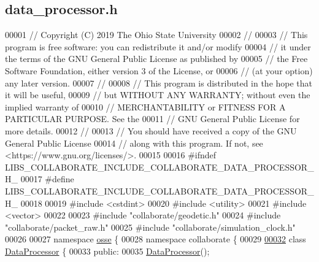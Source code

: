 \hypertarget{data__processor_8h_source}{}\subsection{data\+\_\+processor.\+h}
\label{data__processor_8h_source}

\begin{DoxyCode}
00001 \textcolor{comment}{// Copyright (C) 2019 The Ohio State University}
00002 \textcolor{comment}{//}
00003 \textcolor{comment}{// This program is free software: you can redistribute it and/or modify}
00004 \textcolor{comment}{// it under the terms of the GNU General Public License as published by}
00005 \textcolor{comment}{// the Free Software Foundation, either version 3 of the License, or}
00006 \textcolor{comment}{// (at your option) any later version.}
00007 \textcolor{comment}{//}
00008 \textcolor{comment}{// This program is distributed in the hope that it will be useful,}
00009 \textcolor{comment}{// but WITHOUT ANY WARRANTY; without even the implied warranty of}
00010 \textcolor{comment}{// MERCHANTABILITY or FITNESS FOR A PARTICULAR PURPOSE.  See the}
00011 \textcolor{comment}{// GNU General Public License for more details.}
00012 \textcolor{comment}{//}
00013 \textcolor{comment}{// You should have received a copy of the GNU General Public License}
00014 \textcolor{comment}{// along with this program.  If not, see <https://www.gnu.org/licenses/>.}
00015 
00016 \textcolor{preprocessor}{#ifndef LIBS\_COLLABORATE\_INCLUDE\_COLLABORATE\_DATA\_PROCESSOR\_H\_}
00017 \textcolor{preprocessor}{#define LIBS\_COLLABORATE\_INCLUDE\_COLLABORATE\_DATA\_PROCESSOR\_H\_}
00018 
00019 \textcolor{preprocessor}{#include <cstdint>}
00020 \textcolor{preprocessor}{#include <utility>}
00021 \textcolor{preprocessor}{#include <vector>}
00022 
00023 \textcolor{preprocessor}{#include "collaborate/geodetic.h"}
00024 \textcolor{preprocessor}{#include "collaborate/packet\_raw.h"}
00025 \textcolor{preprocessor}{#include "collaborate/simulation\_clock.h"}
00026 
00027 \textcolor{keyword}{namespace }\hyperlink{namespaceosse}{osse} \{
00028 \textcolor{keyword}{namespace }collaborate \{
00029 
\hyperlink{classosse_1_1collaborate_1_1_data_processor}{00032} \textcolor{keyword}{class }\hyperlink{classosse_1_1collaborate_1_1_data_processor}{DataProcessor} \{
00033  \textcolor{keyword}{public}:
00035   \hyperlink{classosse_1_1collaborate_1_1_data_processor_ac967fe6b10b12e0eede67fc26001202e}{DataProcessor}();

\end{DoxyCode}
